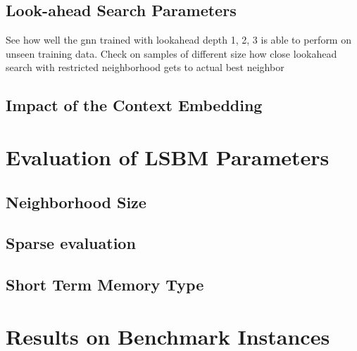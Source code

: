\documentclass[draft,final]{vutinfth} %
\begin{document}
\subsection{Look-ahead Search Parameters}
See how well the gnn trained with lookahead depth 1, 2, 3 is able to perform on unseen training data. 
Check on samples of different size how close lookahead search with restricted neighborhood gets to actual best neighbor 


\subsection{Impact of the Context Embedding}

\section{Evaluation of LSBM Parameters}\label{sec:lsbm}

\subsection{Neighborhood Size}

\subsection{Sparse evaluation}

\subsection{Short Term Memory Type}

\section{Results on Benchmark Instances}\label{sec:benchmark-results}
\end{document}

